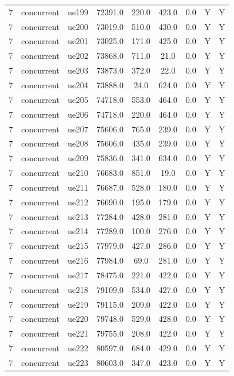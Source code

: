 \begin{table}[ht]
\begin{tabular}{|c|c|c|c|c|c|c|c|c|}
7 & concurrent & ue199 & 72391.0 & 220.0 & 423.0 & 0.0 & Y & Y \\
7 & concurrent & ue200 & 73019.0 & 510.0 & 430.0 & 0.0 & Y & Y \\
7 & concurrent & ue201 & 73025.0 & 171.0 & 425.0 & 0.0 & Y & Y \\
7 & concurrent & ue202 & 73868.0 & 711.0 & 21.0 & 0.0 & Y & Y \\
7 & concurrent & ue203 & 73873.0 & 372.0 & 22.0 & 0.0 & Y & Y \\
7 & concurrent & ue204 & 73888.0 & 24.0 & 624.0 & 0.0 & Y & Y \\
7 & concurrent & ue205 & 74718.0 & 553.0 & 464.0 & 0.0 & Y & Y \\
7 & concurrent & ue206 & 74718.0 & 220.0 & 464.0 & 0.0 & Y & Y \\
7 & concurrent & ue207 & 75606.0 & 765.0 & 239.0 & 0.0 & Y & Y \\
7 & concurrent & ue208 & 75606.0 & 435.0 & 239.0 & 0.0 & Y & Y \\
7 & concurrent & ue209 & 75836.0 & 341.0 & 634.0 & 0.0 & Y & Y \\
7 & concurrent & ue210 & 76683.0 & 851.0 & 19.0 & 0.0 & Y & Y \\
7 & concurrent & ue211 & 76687.0 & 528.0 & 180.0 & 0.0 & Y & Y \\
7 & concurrent & ue212 & 76690.0 & 195.0 & 179.0 & 0.0 & Y & Y \\
7 & concurrent & ue213 & 77284.0 & 428.0 & 281.0 & 0.0 & Y & Y \\
7 & concurrent & ue214 & 77289.0 & 100.0 & 276.0 & 0.0 & Y & Y \\
7 & concurrent & ue215 & 77979.0 & 427.0 & 286.0 & 0.0 & Y & Y \\
7 & concurrent & ue216 & 77984.0 & 69.0 & 281.0 & 0.0 & Y & Y \\
7 & concurrent & ue217 & 78475.0 & 221.0 & 422.0 & 0.0 & Y & Y \\
7 & concurrent & ue218 & 79109.0 & 534.0 & 427.0 & 0.0 & Y & Y \\
7 & concurrent & ue219 & 79115.0 & 209.0 & 422.0 & 0.0 & Y & Y \\
7 & concurrent & ue220 & 79748.0 & 529.0 & 428.0 & 0.0 & Y & Y \\
7 & concurrent & ue221 & 79755.0 & 208.0 & 422.0 & 0.0 & Y & Y \\
7 & concurrent & ue222 & 80597.0 & 684.0 & 429.0 & 0.0 & Y & Y \\
7 & concurrent & ue223 & 80603.0 & 347.0 & 423.0 & 0.0 & Y & Y \\

\end{tabular}
\end{table}
